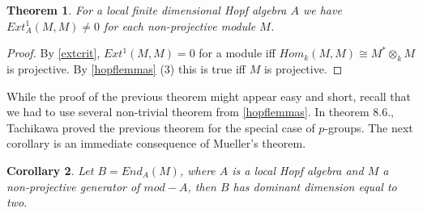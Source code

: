 \documentclass[a4paper]{amsart}
\newtheorem{theorem}{Theorem}[section]
\newtheorem{corollary}[theorem]{Corollary}
\theoremstyle{definition}
\theoremstyle{remark}
\numberwithin{equation}{theorem}
\begin{document}
\begin{theorem} \label{tachtheo}
For a local finite dimensional Hopf algebra $A$ we have $Ext_A^1(M,M) \neq 0$ for each non-projective module $M$. 
\end{theorem}
\begin{proof}

By \ref{extcrit}, $Ext^{1}(M,M)=0$ for a module iff $Hom_k(M,M) \cong M^{*} \otimes_k M$ is projective. By \ref{hopflemmas} (3) this is true iff $M$ is projective.
\end{proof}
While the proof of the previous theorem might appear easy and short, recall that we had to use several non-trivial theorem from \ref{hopflemmas}.
In \cite{Ta} theorem 8.6., Tachikawa proved the previous theorem for the special case of $p$-groups. The next corollary is an immediate consequence of Mueller's theorem.
\begin{corollary}
Let $B=End_A(M)$, where $A$ is a local Hopf algebra and $M$ a non-projective generator of $mod-A$, then $B$ has dominant dimension equal to two.
\end{corollary}
\end{document}

